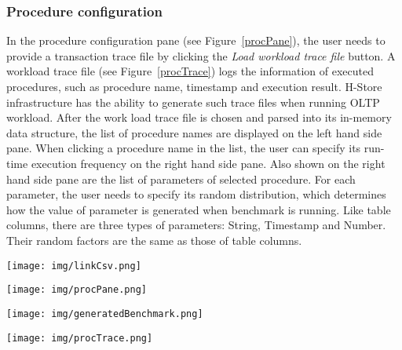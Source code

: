 \documentclass[a4paper,10pt]{article}
\begin{document}
\subsubsection{Procedure configuration}
In the procedure configuration pane (see  Figure~\ref{procPane}), the user needs to provide a transaction trace file by clicking the \emph{Load workload trace file} button. A workload trace file (see Figure~\ref{procTrace}) logs the information of executed procedures, such as procedure name, timestamp and execution result. H-Store infrastructure has the ability to generate such trace files when running OLTP workload. After the work load trace file is chosen and parsed into its in-memory data structure, the list of procedure names are displayed on the left hand side pane. When clicking a procedure name in the list, the user can specify its run-time execution frequency on the right hand side pane. Also shown on the right hand side pane are the list of parameters of selected procedure. For each parameter, the user needs to specify its random distribution, which determines how the value of parameter is generated when benchmark is running. Like table columns, there are three types of parameters: String, Timestamp and Number. Their random factors are the same as those of table columns.

\begin{figure*}
\centering
\texttt{[image: img/linkCsv.png]}
\caption{Link table to csv file}
\label{linkCsv}
\end{figure*}

\begin{figure*}
\centering
\begin{minipage}[t]{3.0in}
    \centering
   \texttt{[image: img/procPane.png]}
   \caption{Procedure configuration}
   \label{procPane}
\end{minipage}
\begin{minipage}[t]{3.0in}
    \centering
    \texttt{[image: img/generatedBenchmark.png]}
    \caption{Generated benchmark code}
    \label{generatedBenchmark}
\end{minipage}
\end{figure*}


\begin{figure*}
\texttt{[image: img/procTrace.png]}
\caption{Part of a workload trace}
\label{procTrace}
\end{figure*}
\end{document}
